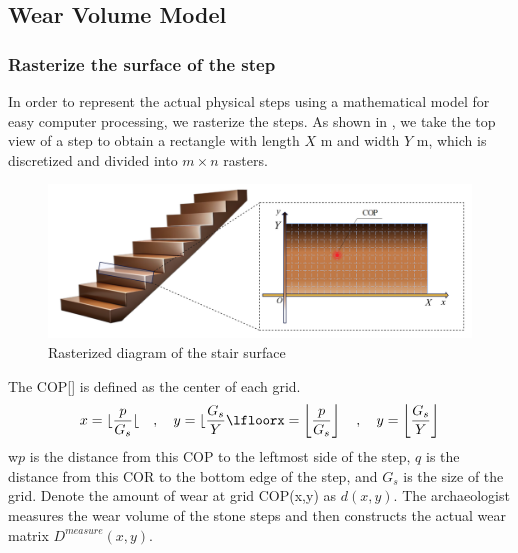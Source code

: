 \documentclass[12pt]{article}  %
\numberwithin{equation}{section} %
\begin{document}
\subsection{Wear Volume Model}
\subsubsection{Rasterize the surface of the step}
In order to represent the actual physical steps using a mathematical model for easy computer processing, we rasterize the steps. As shown in \label{Rasterization}, we take the top view of a step to obtain a rectangle with length $X$ m and width $Y$ m, which is discretized and divided into $m\times{n}$ rasters.


\begin{figure}[H]
	\centering
	\includegraphics[width=0.9\linewidth]{美赛Latex模板/image.png}
	\caption{Rasterized diagram of the stair surface}
	\label{Rasterization}
     \vspace{-2em} %
\end{figure}

The COP[] is defined as the center of each grid.
\begin{equation}
     x=\lfloor \frac{p}{G_s} \lfloor\quad,\quad y=\lfloor \frac{G_s}{Y}\lfloorx = \left\lfloor \frac{p}{G_s} \right\rfloor \quad,\quad y = \left\lfloor \frac{G_s}{Y} \right\rfloor
\end{equation}
w$p$ is the distance from this COP to the leftmost side of the step, $q$ is the distance from this COR to the bottom edge of the step, and $G_s$ is the size of the grid. Denote the amount of wear at grid COP(x,y) as $d(x,y)$. The archaeologist measures the wear volume of the stone steps and then constructs the actual wear matrix $D^{measure}(x,y)$.
\end{document}
